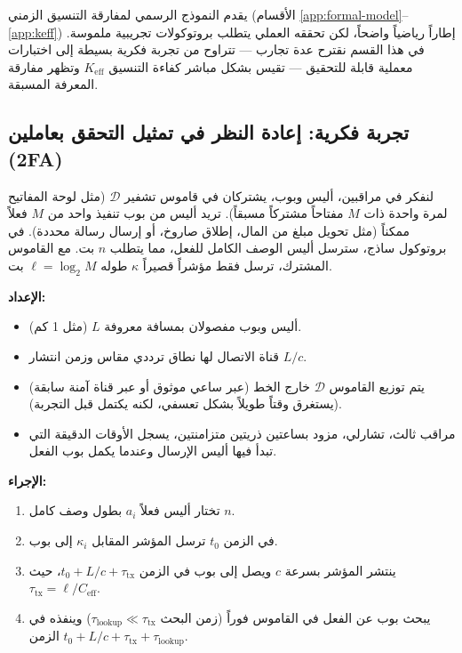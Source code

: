 \documentclass[11pt,a4paper]{article}
\begin{document}
	يقدم النموذج الرسمي لمفارقة التنسيق الزمني (الأقسام \ref{app:formal-model}--\ref{app:keff}) إطاراً رياضياً واضحاً، لكن تحققه العملي يتطلب بروتوكولات تجريبية ملموسة. في هذا القسم نقترح عدة تجارب — تتراوح من تجربة فكرية بسيطة إلى اختبارات معملية قابلة للتحقيق — تقيس بشكل مباشر كفاءة التنسيق \(K_{\mathrm{eff}}\) وتظهر مفارقة المعرفة المسبقة.
	
	\subsection{تجربة فكرية: إعادة النظر في تمثيل التحقق بعاملين (2FA)}
	\label{subsec:thought-2fa}
	
	لنفكر في مراقبين، أليس وبوب، يشتركان في قاموس تشفير \(\mathcal{D}\) (مثل لوحة المفاتيح لمرة واحدة ذات \(M\) مفتاحاً مشتركاً مسبقاً). تريد أليس من بوب تنفيذ واحد من \(M\) فعلاً ممكناً (مثل تحويل مبلغ من المال، إطلاق صاروخ، أو إرسال رسالة محددة). في بروتوكول ساذج، سترسل أليس الوصف الكامل للفعل، مما يتطلب \(n\) بت. مع القاموس المشترك، ترسل فقط مؤشراً قصيراً \(\kappa\) طوله \(\ell = \log_2 M\) بت.
	
	\textbf{الإعداد:}
	\begin{itemize}
		\item أليس وبوب مفصولان بمسافة معروفة \(L\) (مثل 1 كم).
		\item قناة الاتصال لها نطاق ترددي مقاس وزمن انتشار \(L/c\).
		\item يتم توزيع القاموس \(\mathcal{D}\) خارج الخط (عبر ساعي موثوق أو عبر قناة آمنة سابقة) (يستغرق وقتاً طويلاً بشكل تعسفي، لكنه يكتمل قبل التجربة).
		\item مراقب ثالث، تشارلي، مزود بساعتين ذريتين متزامنتين، يسجل الأوقات الدقيقة التي تبدأ فيها أليس الإرسال وعندما يكمل بوب الفعل.
	\end{itemize}
	
	\textbf{الإجراء:}
	\begin{enumerate}
		\item تختار أليس فعلاً \(a_i\) بطول وصف كامل \(n\).
		\item في الزمن \(t_0\) ترسل المؤشر المقابل \(\kappa_i\) إلى بوب.
		\item ينتشر المؤشر بسرعة \(c\) ويصل إلى بوب في الزمن \(t_0 + L/c + \tau_{\text{tx}}\)، حيث \(\tau_{\text{tx}} = \ell / C_{\text{eff}}\).
		\item يبحث بوب عن الفعل في القاموس فوراً (زمن البحث \(\tau_{\text{lookup}} \ll \tau_{\text{tx}}\)) وينفذه في الزمن \(t_0 + L/c + \tau_{\text{tx}} + \tau_{\text{lookup}}\).
	\end{enumerate}
	
\end{document}
